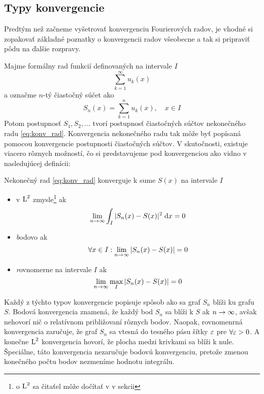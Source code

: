 \subsection{Typy konvergencie}

Predtým než začneme vyšetrovať konvergenciu Fourierových radov, je
vhodné si zopakovať základné poznatky o konvergencii radov všeobecne
a tak si pripraviť pôdu na ďalšie rozpravy.

Majme formálny rad funkcií definovaných na intervale $I$
\begin{equation}
    \sum_{k=1}^{\infty} u_k(x)
    \label{eq:konv_rad}
\end{equation}
a označme $n$-tý čiastočný súčet ako
\begin{equation}
    S_n(x) = \sum_{k=1}^{n} u_k(x), \quad x\in I
    \label{eq:konv_sucet}
\end{equation}
Potom postupnosť $S_1,S_2, \dots$ tvorí postupnosť čiastočných súčtov
nekonečného radu \ref{eq:konv_rad}. Konvergencia nekonečného radu tak
môže byť popísaná pomocou konvergencie postupnosti čiastočných súčtov.
V skutočnosti, existuje viacero rôznych možností, čo si predstavujeme
pod konvergenciou ako vidno v nasledujúcej definícii:

\begin{definicia}
    Nekonečný rad \ref{eq:konv_rad} konverguje k sume $S(x)$ na
    intervale $I$
    \begin{itemize}
        \item {v $\mbox{L}^2$ zmysle\footnote{o $\mbox{L}^2$ sa čitaťel môže dočítať v
        v sekcii \todo{}}} ak 
            \begin{equation}
                \lim_{n \rightarrow \infty} \int_I |S_n(x) - S(x)|^2 \; \mathrm{d} x = 0
            \end{equation}
        \item {\emph bodovo} ak 
            \begin{equation}
                \forall x\in I: \lim_{n \rightarrow \infty} |S_n(x) - S(x)| = 0
            \end{equation}
        \item {\emph rovnomerne na intervale $I$} ak 
            \begin{equation}
                \lim_{n \rightarrow \infty} \max_I |S_n(x) - S(x)| = 0
            \end{equation}        
    \end{itemize}
\end{definicia}
Každý z týchto typov konvergencie popisuje spôsob ako sa graf $S_n$
blíži ku grafu $S$.
Bodová konvergencia znamená, že každý bod $S_n$ sa blíži k $S$ ak
$n\rightarrow\infty$, avšak nehovorí nič o relatívnom približovaní rôznych
bodov. Naopak, rovnomenrná konvergencia zaručuje, že graf $S_n$ sa
vtesná do tesného pásu šítky $\varepsilon$ pre $\forall \varepsilon>0$.
A konečne $\mbox{L}^2$ konvergencia hovorí, že plocha medzi
krivkami sa blíži k nule. Špeciálne, táto konvergencia nezaručuje
bodovú konvergenciu, pretože zmenou konečného počtu bodov nezmeníme
hodnotu integrálu.

